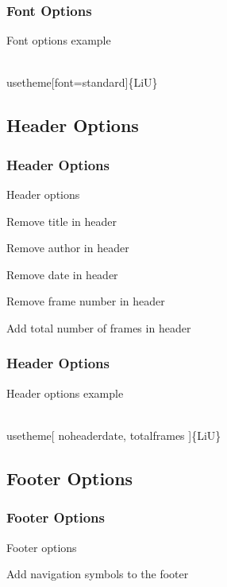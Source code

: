 \documentclass[noamsthm, english]{beamer}%
\newenvironment{codeblock}[1][Example Code]
    {\begin{block}{#1}\footnotesize\vspace{-1em}\begin{semiverbatim}}%
    {\end{semiverbatim}\vspace{-1em}\end{block}}%
\begin{document}
\begin{frame}[fragile]
\frametitle{Font Options}
\begin{codeblock}[Font options example]
\\usetheme[font=standard]\{LiU\}
\end{codeblock}
\end{frame}

\subsection{Header Options}

\begin{frame}
\frametitle{Header Options}
\begin{block}{Header options}
\centering \footnotesize
\begin{description}[noheadernumber]
\item[noheadertitle] Remove title in header
\item[noheaderauthor] Remove author in header
\item[noheaderdate] Remove date in header
\item[noheadernumber] Remove frame number in header
\item[totalframes] Add total number of frames in header
\end{description}
\end{block}
\end{frame}

\begin{frame}[fragile]
\frametitle{Header Options}
\begin{codeblock}[Header options example]
\\usetheme[%
\hspace{1em}noheaderdate,%
\hspace{1em}totalframes%
]\{LiU\}
\end{codeblock}
\end{frame}

\subsection{Footer Options}

\begin{frame}
\frametitle{Footer Options}
\begin{block}{Footer options}
\centering \footnotesize
\begin{description}[navigation]
\item[navigation] Add navigation symbols to the footer
\end{description}
\end{block}
\end{frame}
\end{document}
